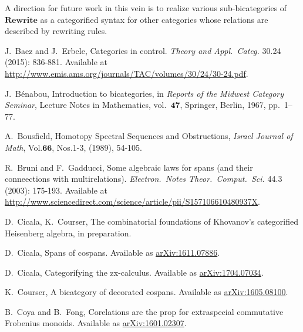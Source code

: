 \documentclass[11pt]{amsart}
\newcommand{\cat}[1]{\mathbf{#1}}
\theoremstyle{remark}
\theoremstyle{definition}
\begin{document}
A direction for future work in this vein
is to realize various sub-bicategories 
of $\cat{ Rewrite }$ as a categorified 
syntax for other categories whose 
relations are described by rewriting rules.



%
%

%
\begin{thebibliography}{100}

J.~Baez and J.~Erbele,
Categories in control.
\emph{Theory and Appl.~Categ.} 
30.24 (2015): 836-881.
Available at \href{http://www.emis.ams.org/journals/TAC/volumes/30/24/30-24.pdf}{http://www.emis.ams.org/journals/TAC/volumes/30/24/30-24.pdf}.

J.~B\'enabou, 
Introduction to bicategories, 
in \emph{Reports of the Midwest Category Seminar}, 
Lecture Notes in Mathematics, 
vol.\ $\cat{47}$, 
Springer, Berlin, 1967, pp.\ 1--77. 

A.\ Bousfield,
Homotopy Spectral Sequences and Obstructions,
\emph{Israel Journal of Math},
Vol.$\mathbf{66}$, Nos.1-3, (1989), 54-105.

R.~Bruni and F.~Gadducci,
Some algebraic laws for spans (and their conneections with multirelations).
\emph{Electron.~Notes Theor.~Comput.~Sci.}
44.3 (2003): 175-193.
Available at \href{http://www.sciencedirect.com/science/article/pii/S157106610480937X}{http://www.sciencedirect.com/science/article/pii/S157106610480937X}.


D.~Cicala, K.~Courser,
The combinatorial foundations of Khovanov's categorified Heisenberg algebra, in preparation.

D.~Cicala, 
Spans of cospans.
Available as \href{https://arxiv.org/abs/1611.07886}{arXiv:1611.07886}.

D.~Cicala, 
Categorifying the zx-calculus.
Available as \href{https://arxiv.org/abs/1704.07034}{arXiv:1704.07034}.

K.~Courser, 
A bicategory of decorated cospans. 
Available as \href{https://arxiv.org/pdf/1605.08100v2.pdf}{arXiv:1605.08100}.

B.~Coya and B.~Fong,
Corelations are the prop for extraspecial commutative Frobenius monoids.
Available as \href{https://arxiv.org/abs/1601.02307}{arXiv:1601.02307}.


\end{thebibliography}
\end{document}
